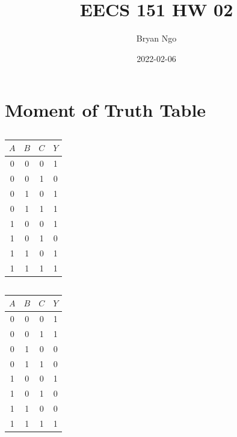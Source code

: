\documentclass{article}
\title{EECS 151 HW 02}
\author{Bryan Ngo}
\date{2022-02-06}
\begin{document}
\maketitle

\section{Moment of Truth Table}

\subsection{}

\begin{tabular}{||c|c|c||c||}
    \hline
    \(A\) & \(B\) & \(C\) & \(Y\) \\
    \hline
    0 & 0 & 0 & 1 \\
    0 & 0 & 1 & 0 \\
    0 & 1 & 0 & 1 \\
    0 & 1 & 1 & 1 \\
    1 & 0 & 0 & 1 \\
    1 & 0 & 1 & 0 \\
    1 & 1 & 0 & 1 \\
    1 & 1 & 1 & 1 \\
    \hline
\end{tabular}

\subsection{}

\begin{tabular}{||c|c|c||c||}
    \hline
    \(A\) & \(B\) & \(C\) & \(Y\) \\
    \hline
    0 & 0 & 0 & 1 \\
    0 & 0 & 1 & 1 \\
    0 & 1 & 0 & 0 \\
    0 & 1 & 1 & 0 \\
    1 & 0 & 0 & 1 \\
    1 & 0 & 1 & 0 \\
    1 & 1 & 0 & 0 \\
    1 & 1 & 1 & 1 \\
    \hline
\end{tabular}

\subsection{}
\end{document}
